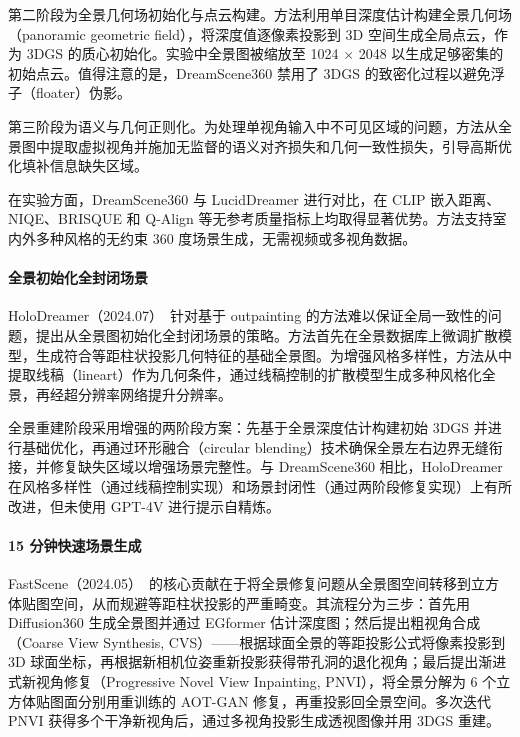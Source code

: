 第二阶段为全景几何场初始化与点云构建。方法利用单目深度估计构建全景几何场（panoramic geometric field），将深度值逐像素投影到 3D 空间生成全局点云，作为 3DGS 的质心初始化。实验中全景图被缩放至 1024 $\times$ 2048 以生成足够密集的初始点云。值得注意的是，DreamScene360 禁用了 3DGS 的致密化过程以避免浮子（floater）伪影。

第三阶段为语义与几何正则化。为处理单视角输入中不可见区域的问题，方法从全景图中提取虚拟视角并施加无监督的语义对齐损失和几何一致性损失，引导高斯优化填补信息缺失区域。

在实验方面，DreamScene360 与 LucidDreamer 进行对比，在 CLIP 嵌入距离、NIQE、BRISQUE 和 Q-Align 等无参考质量指标上均取得显著优势。方法支持室内外多种风格的无约束 360 度场景生成，无需视频或多视角数据。

\paragraph{全景初始化全封闭场景}

HoloDreamer（2024.07）~\cite{2407_15187}针对基于 outpainting 的方法难以保证全局一致性的问题，提出从全景图初始化全封闭场景的策略。方法首先在全景数据库上微调扩散模型，生成符合等距柱状投影几何特征的基础全景图。为增强风格多样性，方法从中提取线稿（lineart）作为几何条件，通过线稿控制的扩散模型生成多种风格化全景，再经超分辨率网络提升分辨率。

全景重建阶段采用增强的两阶段方案：先基于全景深度估计构建初始 3DGS 并进行基础优化，再通过环形融合（circular blending）技术确保全景左右边界无缝衔接，并修复缺失区域以增强场景完整性。与 DreamScene360 相比，HoloDreamer 在风格多样性（通过线稿控制实现）和场景封闭性（通过两阶段修复实现）上有所改进，但未使用 GPT-4V 进行提示自精炼。

\paragraph{15 分钟快速场景生成}

FastScene（2024.05）~\cite{2405_05768}的核心贡献在于将全景修复问题从全景图空间转移到立方体贴图空间，从而规避等距柱状投影的严重畸变。其流程分为三步：首先用 Diffusion360 生成全景图并通过 EGformer 估计深度图；然后提出粗视角合成（Coarse View Synthesis, CVS）——根据球面全景的等距投影公式将像素投影到 3D 球面坐标，再根据新相机位姿重新投影获得带孔洞的退化视角；最后提出渐进式新视角修复（Progressive Novel View Inpainting, PNVI），将全景分解为 6 个立方体贴图面分别用重训练的 AOT-GAN 修复，再重投影回全景空间。多次迭代 PNVI 获得多个干净新视角后，通过多视角投影生成透视图像并用 3DGS 重建。

